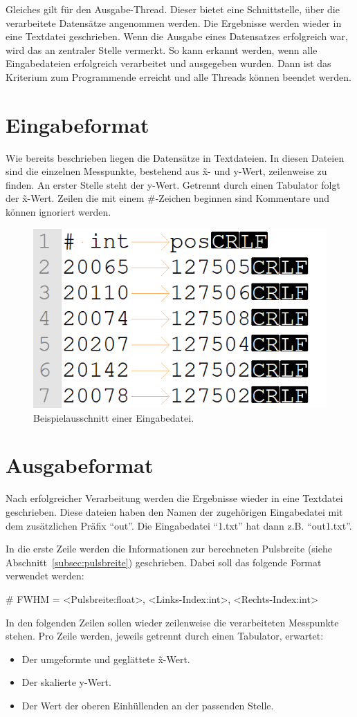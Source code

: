 Gleiches gilt für den Ausgabe-Thread.
Dieser bietet eine Schnittstelle, über die verarbeitete Datensätze angenommen werden.
Die Ergebnisse werden wieder in eine Textdatei geschrieben.
Wenn die Ausgabe eines Datensatzes erfolgreich war, wird das an zentraler Stelle vermerkt.
So kann erkannt werden, wenn alle Eingabedateien erfolgreich verarbeitet und ausgegeben wurden.
Dann ist das Kriterium zum Programmende erreicht und alle Threads können beendet werden.

\section{Eingabeformat}\label{sec:eingabe-format}
Wie bereits beschrieben liegen die Datensätze in Textdateien.
In diesen Dateien sind die einzelnen Messpunkte, bestehend aus \~x- und y-Wert, zeilenweise zu finden.
An erster Stelle steht der y-Wert.
Getrennt durch einen Tabulator folgt der \~x-Wert.
Zeilen die mit einem \#-Zeichen beginnen sind Kommentare und können ignoriert werden.
\begin{figure}[htb]
    \centering
    \includegraphics[width=0.5\linewidth]{images/eingabeDat_bsp}
    \caption{
        Beispielausschnitt einer Eingabedatei.
    }
    \label{fig:eingabe_dat_beispiel}
\end{figure}


\section{Ausgabeformat}\label{sec:ausgabeformat}
Nach erfolgreicher Verarbeitung werden die Ergebnisse wieder in eine Textdatei geschrieben.
Diese dateien haben den Namen der zugehörigen Eingabedatei mit dem zusätzlichen Präfix \enquote{out}.
Die Eingabedatei \enquote{1.txt} hat dann z.B. \enquote{out1.txt}.

In die erste Zeile werden die Informationen zur berechneten Pulsbreite (siehe Abschnitt~\ref{subsec:pulsbreite}) geschrieben.
Dabei soll das folgende Format verwendet werden:
\begin{center}
    \# FWHM = <Pulsbreite:float>, <Links-Index:int>, <Rechts-Index:int>
\end{center}
In den folgenden Zeilen sollen wieder zeilenweise die verarbeiteten Messpunkte stehen.
Pro Zeile werden, jeweils getrennt durch einen Tabulator, erwartet:
\begin{itemize}[noitemsep]
    \item Der umgeformte und geglättete \~x-Wert.
    \item Der skalierte y-Wert.
    \item Der Wert der oberen Einhüllenden an der passenden Stelle.
\end{itemize}

